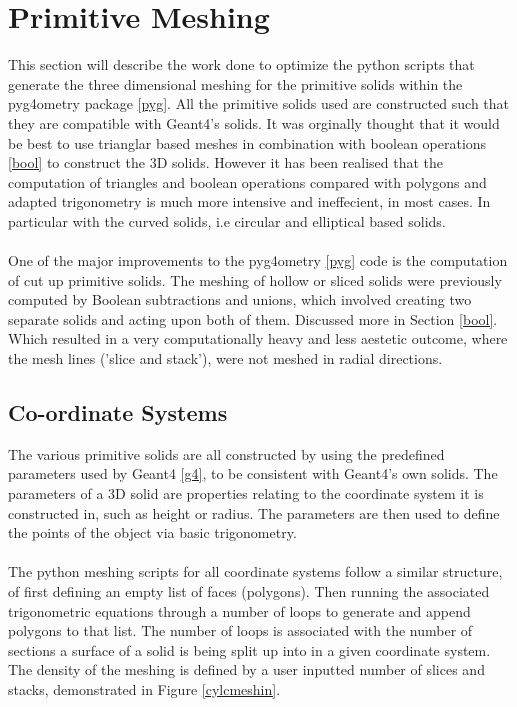 \documentclass[12pt,a4paper]{article}
\begin{document}
\newpage
\section{Primitive Meshing}
\label{prim}
This section will describe the work done to optimize the python scripts that generate the three dimensional meshing for the primitive solids within the pyg4ometry package \ref{pyg}. All the primitive solids used are constructed such that they are compatible with Geant4's solids. It was orginally thought that it would be best to use trianglar based meshes in combination with boolean operations \ref{bool} to construct the 3D solids. However it has been realised that the computation of triangles and boolean operations compared with polygons and adapted trigonometry is much more intensive and ineffecient, in most cases. In particular with the curved solids, i.e circular and elliptical based solids.
\\\\
One of the major improvements to the pyg4ometry \ref{pyg} code is the computation of cut up primitive solids. The meshing of hollow or sliced solids were previously computed by Boolean subtractions and unions, which involved creating two separate solids and acting upon both of them. Discussed more in Section \ref{bool}. Which resulted in a very computationally heavy and less aestetic outcome, where the mesh lines ('slice and stack'), were not meshed in radial directions.

\subsection{Co-ordinate Systems}
The various primitive solids are all constructed by using the predefined parameters used by Geant4 \ref{g4}, to be consistent with Geant4's own solids. The parameters of a 3D solid are properties relating to the coordinate system it is constructed in, such as height or radius. The parameters are then used to define the points of the object via basic trigonometry.
\\\\
The python meshing scripts for all coordinate systems follow a similar structure, of first defining an empty list of faces (polygons). Then running the associated trigonometric equations through a number of loops to generate and append polygons to that list. The number of loops is associated with the number of sections a surface of a solid is being split up into in a given coordinate system. The density of the meshing is defined by a user inputted number of slices and stacks, demonstrated in Figure \ref{cylcmeshin}.
\end{document}
